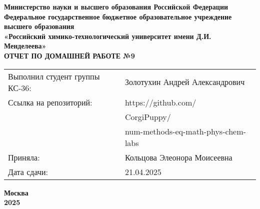\documentclass[12pt, a4paper]{report}
\begin{document}
	\begin{titlepage}
		\begin{center}
			\large \textbf{Министерство науки и высшего образования Российской Федерации} \\
			\large \textbf{Федеральное государственное бюджетное образовательное учреждение высшего образования} \\
			\large \textbf{«Российский химико-технологический университет имени Д.И. Менделеева»} \\

			\vspace*{4cm}
			\LARGE \textbf{ОТЧЕТ ПО ДОМАШНЕЙ РАБОТЕ №9}

			\vspace*{4cm}
			\begin{flushright}
				\Large
				\begin{tabular}{>{\raggedleft\arraybackslash}p{9cm} p{10cm}}
					Выполнил студент группы КС-36: & Золотухин Андрей Александрович \\
					Ссылка на репозиторий: & https://github.com/ \\
					& CorgiPuppy/ \\
					& num-methods-eq-math-phys-chem-labs \\
					Приняла: & Кольцова Элеонора Моисеевна \\
					Дата сдачи: & 21.04.2025 \\
				\end{tabular}
			\end{flushright}

			\vspace*{6cm}
			\Large \textbf{Москва \\ 2025}
		\end{center}
	\end{titlepage}

	\tableofcontents
	\thispagestyle{empty}
	\newpage

\end{document}
